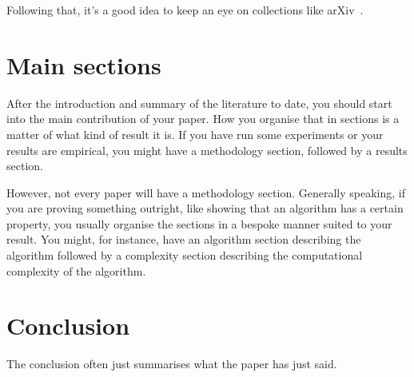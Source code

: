 \documentclass[journal]{IEEEtran}
\begin{document}
  Following that, it's a good idea to keep an eye on collections like
   arXiv~\cite{arxiv:home}.

\section{Main sections}
  After the introduction and summary of the literature to date, you should start
  into the main contribution of your paper. How you organise that in sections
  is a matter of what kind of result it is. If you have run some experiments
  or your results are empirical, you might have a methodology section, followed
  by a results section.

  However, not every paper will have a methodology section. Generally speaking,
  if you are proving something outright, like showing that an algorithm has a
  certain property, you usually organise the sections in a bespoke manner suited
  to your result. You might, for instance, have an algorithm section describing
  the algorithm followed by a complexity section describing the computational
  complexity of the algorithm.

\section{Conclusion}
  The conclusion often just summarises what the paper has just said.



\end{document}
